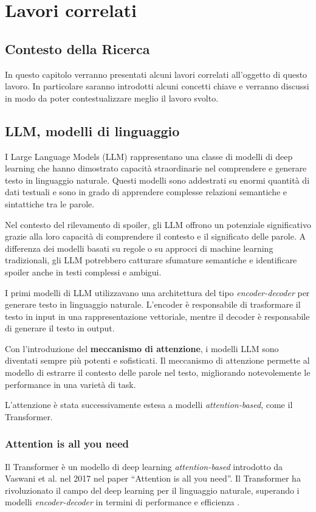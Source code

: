 \chapter{Lavori correlati}
\label{ch:lavori-correlati}

\section{Contesto della Ricerca}
\label{sec:contesto-della-ricerca}
In questo capitolo verranno presentati alcuni lavori
correlati all'oggetto di questo lavoro.
In particolare saranno introdotti alcuni concetti chiave e
verranno discussi in modo da poter contestualizzare meglio
il lavoro svolto.

\section{LLM, modelli di linguaggio}
\label{sec:llm-modelli-di-linguaggio}
I Large Language Models (LLM) rappresentano una classe di
modelli di deep learning che hanno dimostrato capacità
straordinarie nel comprendere e generare testo in
linguaggio naturale.
Questi modelli sono addestrati su enormi quantità di dati
testuali e sono in grado di apprendere complesse relazioni
semantiche e sintattiche tra le parole.

Nel contesto del rilevamento di spoiler, gli LLM offrono un
potenziale significativo grazie alla loro capacità di
comprendere il contesto e il significato delle parole.
A differenza dei modelli basati su regole o su approcci di
machine learning tradizionali, gli LLM potrebbero catturare
sfumature semantiche e identificare spoiler anche in testi
complessi e ambigui.

I primi modelli di LLM utilizzavano una architettura del
tipo \textit{encoder-decoder} per generare testo in
linguaggio naturale.
L'encoder è responsabile di trasformare il testo in input
in una rappresentazione vettoriale, mentre il decoder è
responsabile di generare il testo in output.

Con l'introduzione del \textbf{meccanismo di attenzione}, i
modelli LLM sono diventati sempre più potenti e
sofisticati.
Il meccanismo di attenzione permette al modello di estrarre
il contesto delle parole nel testo, migliorando
notevolemente le performance in una varietà di task.

L'attenzione è stata successivamente estesa a modelli
\textit{attention-based}, come il Transformer.

\subsection{Attention is all you need}
\label{sec:attention-is-all-you-need}
Il Transformer è un modello di deep learning
\textit{attention-based} introdotto da Vaswani et al.
nel 2017 nel paper ``Attention is
all you need''\cite{vaswani2017attention}.
Il Transformer ha rivoluzionato il campo del deep learning
per il linguaggio naturale, superando i modelli
\textit{encoder-decoder} in termini di performance e
efficienza \cite{google2017transformer}.

